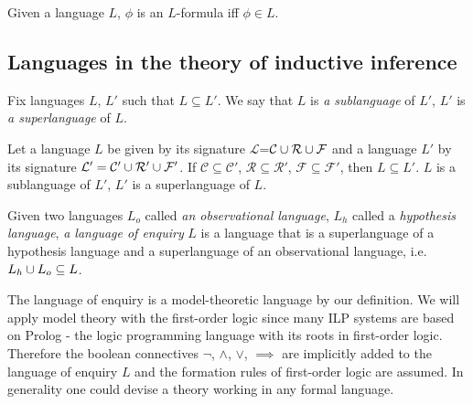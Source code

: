 \begin{defn}
Given a language $L$, $\phi$ is an $L$-formula iff $\phi \in L$.
\end{defn}

\subsection{Languages in the theory of inductive inference}
\begin{defn}
Fix languages $L$, $L'$ such that $L \subseteq L'$. We say that $L$ is \emph{a sublanguage} of $L'$, $L'$ is \emph{a superlanguage} of $L$.
\end{defn}

\begin{exmp}
Let a language $L$ be given by its signature $\mathcal{L}$=$\mathcal{C} \cup \mathcal{R} \cup \mathcal{F}$ and a language $L'$ by its signature $\mathcal{L}'=\mathcal{C}' \cup \mathcal{R}' \cup \mathcal{F}'$.
If $\mathcal{C} \subseteq \mathcal{C}'$, $\mathcal{R} \subseteq \mathcal{R}'$, $\mathcal{F} \subseteq \mathcal{F}'$, then $L \subseteq L'$. $L$ is a sublanguage of $L'$, $L'$ is a superlanguage of $L$.
\end{exmp}

\begin{defn}
Given two languages $L_o$ called \emph{an observational language}, $L_h$ called a \emph{hypothesis language}, \emph{a language of enquiry} $L$ is a language that is a superlanguage of a hypothesis language and a superlanguage of an observational language, i.e. $L_h \cup L_o \subseteq L$.
\end{defn}

\begin{remark}
The language of enquiry is a model-theoretic language by our definition. We will apply model theory with the first-order logic since many ILP systems are based on Prolog - the logic programming language with its roots in first-order logic. Therefore the boolean connectives $\neg$, $\land$, $\lor$, $\implies$ are implicitly added to the language of enquiry $L$ and the formation rules of first-order logic are assumed. In generality one could devise a theory working in any formal language.
\end{remark}

